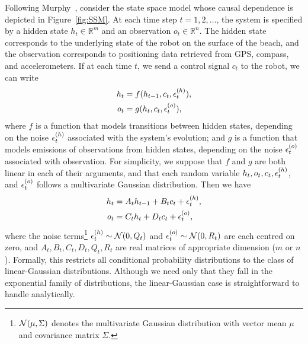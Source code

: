         Following Murphy~\cite{murphy}, consider the state space model whose causal dependence is depicted in Figure~\ref{fig:SSM}.
        At each time step $t = 1, 2, \ldots$, the system is specified by a hidden state $h_t \in \mathbb{R}^{m}$ and an observation $o_t \in \mathbb{R}^{n}$.
        The hidden state corresponds to the underlying state of the robot on the surface of the beach, and the observation corresponds to positioning data retrieved from GPS, compass, and accelerometers.
        If at each time $t$, we send a control signal $c_t$ to the robot, we can write
        \begin{align}
            h_t &= f(h_{t-1}, c_t, \epsilon^{(h)}_t), \\
            o_t &= g(h_{t}, c_t, \epsilon^{(o)}_t),
        \end{align}
        where $f$ is a function that models transitions between hidden states, depending on the noise $\epsilon^{(h)}_t$ associated with the system's evolution; and $g$ is a function that models emissions of observations from hidden states, depending on the noise $\epsilon^{(o)}_t$ associated with observation.
        For simplicity, we suppose that $f$ and $g$ are both linear in each of their arguments, and that each random variable $h_t, o_t, c_t, \epsilon^{(h)}_t$, and $\epsilon^{(o)}_t$ follows a multivariate Gaussian distribution.
        Then we have
        \begin{align}
            h_t &= A_t h_{t-1} + B_t c_t + \epsilon^{(h)}_t, \\
            o_t &= C_t h_{t} + D_t c_t + \epsilon^{(o)}_t,
        \end{align}
        where the noise terms\footnote{$\mathcal{N}(\mu, \Sigma)$ denotes the multivariate Gaussian distribution with vector mean $\mu$ and covariance matrix $\Sigma$.} $\epsilon^{(h)}_t \sim \mathcal{N}(0, Q_t)$ and $\epsilon^{(o)}_t \sim \mathcal{N}(0, R_t)$ are each centred on zero, and $A_t, B_t, C_t, D_t, Q_t, R_t$ are real matrices of appropriate dimension ($m$ or $n$).
        Formally, this restricts all conditional probability distributions to the class of linear-Gaussian distributions.
        Although we need only that they fall in the exponential family of distributions, the linear-Gaussian case is straightforward to handle analytically.

